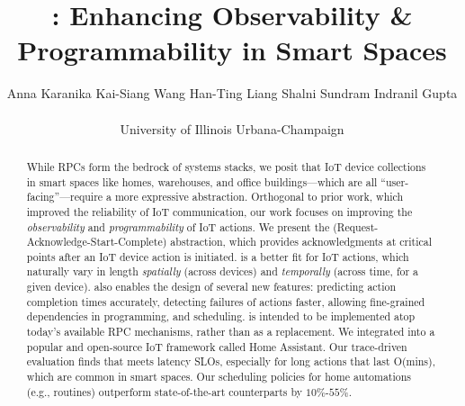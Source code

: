 \title{\abstraction{}: Enhancing Observability \& Programmability in Smart Spaces}

\author{
{\rm Anna Karanika \hspace{1em} Kai-Siang Wang \hspace{1em} Han-Ting Liang \hspace{1em} Shalni Sundram \hspace{1em} Indranil Gupta}
\\\\
University of Illinois Urbana-Champaign
} %

\maketitle


\begin{abstract}

While RPCs form the bedrock of systems stacks, we posit that IoT device collections in smart spaces like homes, warehouses, and office buildings---which are all ``user-facing''---require a more expressive abstraction.
Orthogonal to prior work, which improved the {reliability} of IoT communication, our work focuses on improving the {\it observability} and {\it programmability} of IoT actions.
We present the \abstraction{} (Request-Acknowledge-Start-Complete) abstraction, which provides acknowledgments at critical points after an IoT device action is initiated. \abstraction{} is a better fit for
IoT actions, which naturally vary in length {\it spatially} (across devices) and {\it temporally} (across time, for a given device).
\abs{} also enables the design of several new features: predicting action completion times accurately, detecting failures of actions faster, allowing fine-grained dependencies in programming, and scheduling.
\abs{} is intended to be implemented atop today's available RPC mechanisms, rather than as a replacement. We integrated \abs{} into a popular and open-source IoT framework called Home Assistant.
Our trace-driven evaluation finds that \abstraction{} meets latency SLOs,
especially for long actions that last  O(mins), which are common in smart spaces.
Our scheduling policies for home automations (e.g., routines) outperform state-of-the-art counterparts by $10\%$-$55\%$.

\end{abstract}
